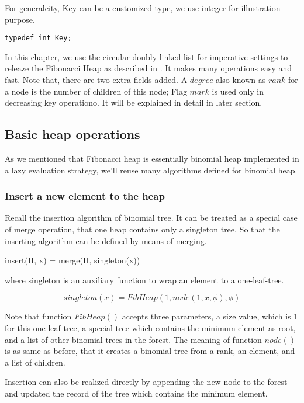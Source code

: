\documentclass{article}
\begin{document}
For generalcity, Key can be a customized type, we use integer for illustration
purpose.

\lstset{language=C}
\begin{lstlisting}
typedef int Key;
\end{lstlisting}

In this chapter, we use the circular doubly linked-list for imperative
settings to releaze the Fibonacci Heap as described in \cite{CLRS}.
It makes many operations easy and fast. Note that, there are two extra
fields added. A $degree$ also known as $rank$ for a node is the number
of children of this node; Flag $mark$ is used only in decreasing key
operationo. It will be explained in detail in later section.


\subsection{Basic heap operations}
As we mentioned that Fibonacci heap is essentially binomial heap 
implemented in a lazy evaluation strategy, we'll reuse many algorithms
defined for binomial heap.

\subsubsection{Insert a new element to the heap}
Recall the insertion algorithm of binomial  tree. It can be treated
as a special case of merge operation, that one heap contains only
a singleton tree. So that the inserting algorithm can be defined
by means of merging.

\be
insert(H, x) = merge(H, singleton(x))
\label{eq:fib-insert}
\ee

where singleton is an auxiliary function to wrap an element to a
one-leaf-tree.

\[
singleton(x) = FibHeap(1, node(1, x, \phi), \phi)
\]

Note that function $FibHeap()$ accepts three parameters, a
size value, which is 1 for this one-leaf-tree, a special tree
which contains the minimum element as root, and a list of other
binomial trees in the forest. The meaning of function $node()$ is
as same as before, that it creates a binomial tree from a rank,
an element, and a list of children.

Insertion can also be realized directly by appending the new node
to the forest and updated the record of the tree which contains the
minimum element.
\end{document}
